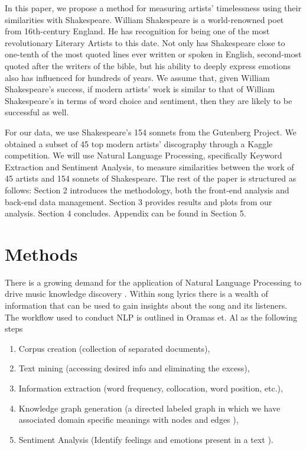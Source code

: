 \documentclass[10pt,a4paper]{article}
\begin{document}
\noindent In this paper, we propose a method for measuring artists’ timelessness using their similarities with Shakespeare. William Shakespeare is a world-renowned poet from 16th-century England. He has recognition for being one of the most revolutionary Literary Artists to this date. Not only has Shakespeare close to one-tenth of the most quoted lines ever written or spoken in English, second-most quoted after the writers of the bible, but his ability to deeply express emotions also has influenced for hundreds of years.\cite{shakeFacts} We assume that, given William Shakespeare’s success, if modern artists’ work is similar to that of William Shakespeare’s in terms of word choice and sentiment, then they are likely to be successful as well.

\noindent For our data, we use Shakespeare's 154 sonnets from the Gutenberg Project. \cite{sonnetsData} We obtained a subset of 45 top modern artists’ discography through a Kaggle competition. We will use Natural Language Processing, specifically Keyword Extraction and Sentiment Analysis, to measure similarities between the work of 45 artists and 154 sonnets of Shakespeare. The rest of the paper is structured as follows: Section 2 introduces the methodology, both the front-end analysis and back-end data management. Section 3 provides results and plots from our analysis. Section 4 concludes. Appendix can be found in Section 5. 

\section{Methods}
There is a growing demand for the application of Natural Language Processing to drive music knowledge discovery \cite{NLP-for-lyrics}. Within song lyrics there is a wealth of information that can be used to gain insights about the song and its listeners. The workflow used to conduct NLP is outlined in Oramas et. Al \cite{NLP-for-music} as the following steps 

\begin{enumerate}

\item Corpus creation (collection of separated documents), 
\item Text mining (accessing desired info and eliminating the excess), 
\item Information extraction (word frequency, collocation, word position, etc.), 
\item Knowledge graph generation (a directed labeled graph in which we have associated domain specific meanings with nodes and edges \cite{knowledge-graphs}), 
\item Sentiment Analysis (Identify feelings and emotions present in a text \cite{monkey}).

\end{enumerate}
 
\end{document}
